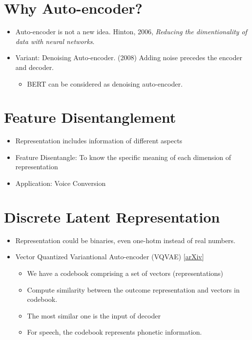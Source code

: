 \documentclass[11pt]{book}
\begin{document}
\section{Why Auto-encoder?}
\begin{itemize}
    \item Auto-encoder is not a new idea. Hinton, 2006, \textit{Reducing the dimentionality of data with neural networks}.
    \item Variant: Denoising Auto-encoder. (2008) Adding noise precedes the encoder and decoder.
    \begin{itemize}
        \item BERT can be considered as denoising auto-encoder.
    \end{itemize}
\end{itemize}

\section{Feature Disentanglement}
\begin{itemize}
    \item Representation includes information of different aspects
    \item Feature Disentangle: To know the specific meaning of each dimension of representation
    \item Application: Voice Conversion
\end{itemize}

\section{Discrete Latent Representation}
\begin{itemize}
    \item Representation could be binaries, even one-hotm instead of real numbers.
    \item Vector Quantized Variantional Auto-encoder (VQVAE) [\href{https://arxiv.org/abs/1711.00937}{arXiv}]
    \begin{itemize}
        \item We have a codebook comprising a set of vectors (representations)
        \item Compute similarity between the outcome representation and vectors in codebook.
        \item The most similar one is the input of decoder
        \item For speech, the codebook represents phonetic information.
    \end{itemize}
\end{itemize}
\end{document}
